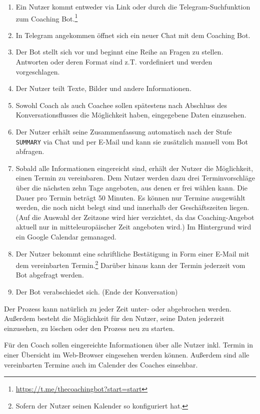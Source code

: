 	\begin{enumerate}
		\item Ein Nutzer kommt entweder via Link oder durch die Telegram-Suchfunktion zum Coaching Bot.\footnote{\url{https://t.me/thecoachingbot?start=start}}
		\item In Telegram angekommen öffnet sich ein neuer Chat mit dem Coaching Bot.
		\item Der Bot stellt sich vor und beginnt eine Reihe an Fragen zu stellen. Antworten oder deren Format sind z.T. vordefiniert und werden vorgeschlagen.
		\item Der Nutzer teilt Texte, Bilder und andere Informationen.
        \item Sowohl Coach als auch Coachee sollen spätestens nach Abschluss des Konversationsflusses die Möglichkeit haben, eingegebene Daten einzusehen.
        \item Der Nutzer erhält seine Zusammenfassung automatisch nach der Stufe \verb|SUMMARY| via Chat und per E-Mail und kann sie zusätzlich manuell vom Bot abfragen.
        \item Sobald alle Informationen eingereicht sind, erhält der Nutzer die Möglichkeit, einen Termin zu vereinbaren. Dem Nutzer werden dazu drei Terminvorschläge über die nächsten zehn Tage angeboten, aus denen er frei wählen kann. Die Dauer pro Termin beträgt 50 Minuten. Es können nur Termine ausgewählt werden, die noch nicht belegt sind und innerhalb der Geschäftszeiten liegen. (Auf die Auswahl der Zeitzone wird hier verzichtet, da das Coaching-Angebot aktuell nur in mitteleuropäischer Zeit angeboten wird.) Im Hintergrund wird ein Google Calendar gemanaged.
        \item Der Nutzer bekommt eine schriftliche Bestätigung in Form einer E-Mail mit dem vereinbarten Termin.\footnote{Sofern der Nutzer seinen Kalender so konfiguriert hat.} Darüber hinaus kann der Termin jederzeit vom Bot abgefragt werden.
        \item Der Bot verabschiedet sich. (Ende der Konversation)

    \end{enumerate}
	Der Prozess kann natürlich zu jeder Zeit unter- oder abgebrochen werden. Außerdem besteht die Möglichkeit für den Nutzer, seine Daten jederzeit einzusehen, zu löschen oder den Prozess neu zu starten.

	Für den Coach sollen eingereichte Informationen über alle Nutzer inkl. Termin in einer Übersicht im Web-Browser eingesehen werden können. Außerdem sind alle vereinbarten Termine auch im Calender des Coaches einsehbar.

